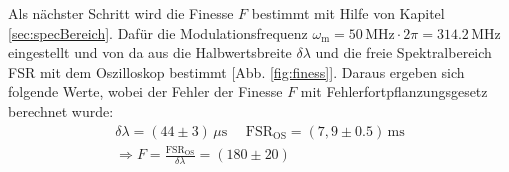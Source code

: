 Als nächster Schritt wird die Finesse $F$ bestimmt mit Hilfe von Kapitel \ref{sec:specBereich}. Dafür die Modulationsfrequenz $\omega_\mathrm{m} = 50\,\mathrm{MHz} \cdot 2\pi = 314.2\,\mathrm{MHz}$ eingestellt und von da aus die Halbwertsbreite $\delta \lambda$ und die freie Spektralbereich FSR mit dem Oszilloskop bestimmt [Abb. \ref{fig:finess}]. Daraus ergeben sich folgende Werte, wobei der Fehler der Finesse $F$ mit Fehlerfortpflanzungsgesetz berechnet wurde:
\begin{gather}
    \delta \lambda = ( 44 \pm 3)\,\mu\mathrm{s}~~~~~~\mathrm{FSR}_\mathrm{OS} = (7,9 \pm 0.5)\,\mathrm{ms}\\[0,5cm]
    \Rightarrow \boxed{F = \frac{\mathrm{FSR}_\mathrm{OS}}{\delta \lambda} = (180 \pm 20)}
\end{gather}
\vspace{0,5cm}
